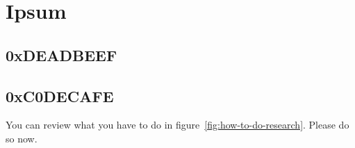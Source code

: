 \chapter{Ipsum}

\section{0xDEADBEEF}


\section{0xC0DECAFE}

You can review what you have to do in figure~\ref{fig:how-to-do-research}.
Please do so now. 
